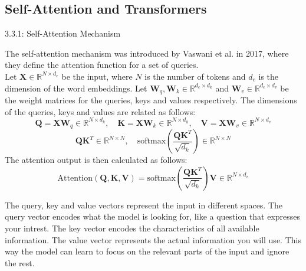 \vspace*{1em}
\subsection{Self-Attention and Transformers}
\label{ex:3.3}


\begin{task}{3.3.1: Self-Attention Mechanism}
\end{task}

The self-attention mechanism was introduced by Vaswani et al. in 2017, where they define the
attention function for a set of queries.\\
Let $\mathbf{X} \in \mathbb{R}^{N \times d_e}$ be the input, where $N$ is the number of tokens and
$d_e$ is the dimension of the word embeddings. Let $\mathbf{W}_q, \mathbf{W}_k \in \mathbb{R}^{d_e
    \times d_k}$ and $\mathbf{W}_v \in \mathbb{R}^{d_e \times d_v}$ be the weight matrices for the
queries, keys and values respectively. The dimensions of the queries, keys and values are related as
follows:
\begin{equation}
  \mathbf{Q} = \mathbf{X} \mathbf{W}_q \in \mathbb{R}^{N \times d_k}, \quad
  \mathbf{K} = \mathbf{X} \mathbf{W}_k \in \mathbb{R}^{N \times d_k}, \quad
  \mathbf{V} = \mathbf{X} \mathbf{W}_v \in \mathbb{R}^{N \times d_v}
\end{equation}
\begin{equation}
  \mathbf{Q} \mathbf{K}^T \in \mathbb{R}^{N \times N}, \quad
  \text{softmax}\left( \frac{\mathbf{Q} \mathbf{K}^T}{\sqrt{d_k}} \right) \in \mathbb{R}^{N \times N}
\end{equation}
The attention output is then calculated as follows:
\begin{equation}
  \text{Attention}(\mathbf{Q}, \mathbf{K}, \mathbf{V}) = \text{softmax}\left( \frac{\mathbf{Q}
    \mathbf{K}^T}{\sqrt{d_k}} \right) \mathbf{V} \in \mathbb{R}^{N \times d_v}
\end{equation}

The query, key and value vectors represent the input in different spaces. The query vector encodes
what the model is looking for, like a question that expresses your intrest. The key vector encodes
the characteristics of all available information. The value vector represents the actual
information you will use. This way the model can learn to focus on the relevant parts of the input
and ignore the rest.



